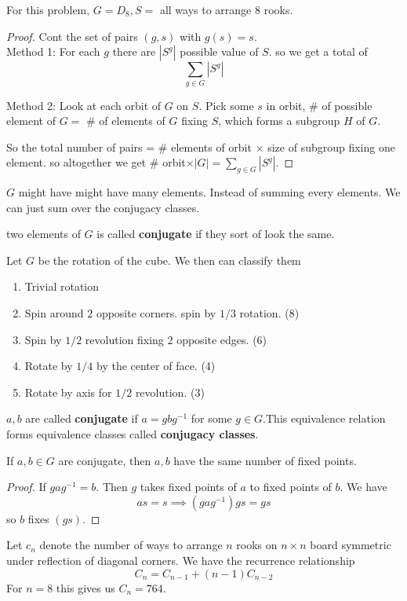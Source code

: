 \begin{remark}
	For this problem, $G = D_8, S = $ all ways to arrange $8$ rooks.
\end{remark}
\begin{proof}
	Cont the set of pairs $(g,s)$ with $g(s) = s$. \\
	Method 1: For each $g$ there are $|S^g|$ possible value of $S$. so we get a total of 
	\[ \sum_{g \in G} |S^g|\]

	Method 2: Look at each orbit of $G$ on $S$. Pick some $s$ in orbit, $\#$ of possible element of $G =$ $\#$ of elements of $G$ fixing $S$, which forms a subgroup $H$ of $G$. 

	So the total number of pairs = $\#$ elements of orbit $\times$ size of subgroup fixing one element. so altogether we get $\#$ orbit$\times |G| = \sum_{g \in G} |S^g|$. 
\end{proof}
\begin{remark}
	$G$ might have might have many elements. Instead of summing every elements. We can just sum over the conjugacy classes.
\end{remark}
\begin{definition}
	two elements of $G$ is called \textbf{conjugate} if they sort of look the same.
\end{definition}
\begin{example}
	Let $G$ be the rotation of the cube. We then can classify them
	\begin{enumerate}
		\item Trivial rotation
		\item Spin around $2$ opposite corners. spin by $1/3$ rotation. (8)
		\item Spin by $1/2$ revolution fixing $2$ opposite edges. (6)
		\item Rotate by $1/4$ by the center of face. (4)
		\item Rotate by axis for $1/2$ revolution. (3)
	\end{enumerate}
\end{example}
\begin{definition}
	$a,b$ are called \textbf{conjugate} if $a = gbg^{-1}$ for some $g \in G$.This equivalence relation forms equivalence classes called \textbf{conjugacy classes}. 
\end{definition}
\begin{proposition}
	If $a,b \in G$ are conjugate, then $a,b$ have the same number of fixed points.
\end{proposition}
\begin{proof}
	If $gag^{-1} = b$. Then $g$ takes fixed points of $a$ to fixed points of $b$. We have
	\[ as = s \implies (gag^{-1})gs = gs\]
	so $b$ fixes $(gs)$.
\end{proof}
Let $c_n$ denote the number of ways to arrange $n$ rooks on $n \times n$ board symmetric under reflection of diagonal corners. We have the recurrence relationship
\[ C_n = C_{n-1} + (n-1) C_{n-2}\]
For $n = 8$ this gives us $C_n = 764$. 


